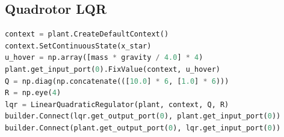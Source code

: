 \documentclass[11pt]{article}
\begin{document}
\subsection{Quadrotor LQR}

\begin{lstlisting}[language=Python]
context = plant.CreateDefaultContext()
context.SetContinuousState(x_star)
u_hover = np.array([mass * gravity / 4.0] * 4)
plant.get_input_port(0).FixValue(context, u_hover)
Q = np.diag(np.concatenate(([10.0] * 6, [1.0] * 6)))
R = np.eye(4)
lqr = LinearQuadraticRegulator(plant, context, Q, R)
builder.Connect(lqr.get_output_port(0), plant.get_input_port(0))
builder.Connect(plant.get_output_port(0), lqr.get_input_port(0))
\end{lstlisting}
\end{document}
